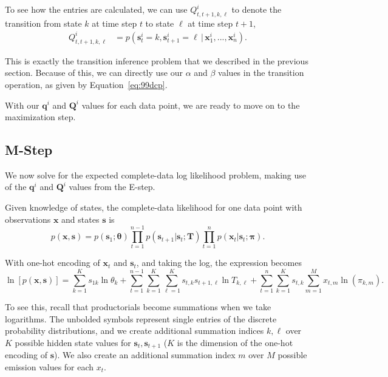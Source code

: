 To see how the entries are calculated, we can use $Q_{t, t+1, k, \ell}^i$ to denote the transition from state $k$ at time step $t$ to state $\ell$ at time step $t+1$,
%
\begin{align}
  Q_{t, t+1, k, \ell}^i %
	&= p(\textbf{s}_{t}^i = k, \textbf{s}_{t+1}^i = \ell\, |\, \textbf{x}_1^i, ..., \textbf{x}_n^i). 
\end{align}

This is exactly the transition inference problem that we described in the previous section.  Because of this, we can directly use our $\alpha$ and $\beta$ values in the transition operation, as given by Equation~\eqref{eq:99dcp}.

With our $\textbf{q}^i$ and $\textbf{Q}^i$ values for each data point, we are ready to move on to the maximization step.

\subsection{M-Step}

We now solve for the expected complete-data log likelihood problem, making use of the
$\textbf{q}^i$ and $\textbf{Q}^i$ values from the E-step.
%

Given knowledge of states, the complete-data likelihood for one data point with observations $\mathbf{x}$ and states $\mathbf{s}$ is
$$
p(\mathbf{x},\mathbf{s})=
p(\mathbf{s}_1;\boldsymbol{\theta})\prod_{t=1}^{n-1}p(\mathbf{s}_{t+1}| \mathbf{s}_{t}; \textbf{T})
\prod_{t=1}^n p(\mathbf{x}_t| \mathbf{s}_t; \boldsymbol{\pi}).
$$

With one-hot encoding of $\textbf{x}_t$ and $\textbf{s}_t$, and taking the log, the expression becomes
$$
\ln[p(\mathbf{x},\mathbf{s})]=
\sum_{k=1}^K s_{1k}\ln\theta_k + \sum_{t=1}^{n-1} \sum_{k=1}^K \sum_{\ell=1}^K s_{t,k} s_{t+1,\ell} \ln T_{k,\ell}
+\sum_{t=1}^n \sum_{k=1}^K s_{t,k} \sum_{m=1}^M x_{t,m}\ln(\pi_{k,m}).
$$

To see this, recall that productorials become summations when we take logarithms. The unbolded symbols represent single entries of the discrete probability distributions, and we create additional summation indices $k,\ell$ over $K$ possible hidden state values for $\textbf{s}_t,\textbf{s}_{t+1}$ ($K$ is the dimension of the one-hot encoding of $\textbf{s}$). We also create an additional summation index $m$ over $M$ possible emission values for each $x_t$.

